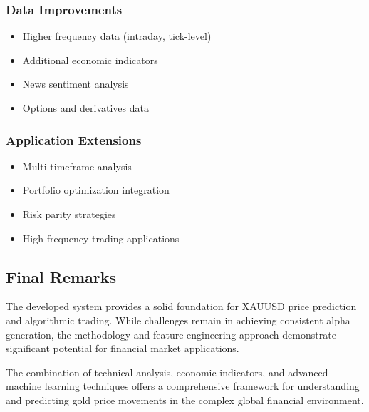 \documentclass[12pt,a4paper]{article}
\begin{document}
\subsubsection{Data Improvements}
\begin{itemize}
    \item Higher frequency data (intraday, tick-level)
    \item Additional economic indicators
    \item News sentiment analysis
    \item Options and derivatives data
\end{itemize}

\subsubsection{Application Extensions}
\begin{itemize}
    \item Multi-timeframe analysis
    \item Portfolio optimization integration
    \item Risk parity strategies
    \item High-frequency trading applications
\end{itemize}

\subsection{Final Remarks}

The developed system provides a solid foundation for XAUUSD price prediction and algorithmic trading. While challenges remain in achieving consistent alpha generation, the methodology and feature engineering approach demonstrate significant potential for financial market applications.

The combination of technical analysis, economic indicators, and advanced machine learning techniques offers a comprehensive framework for understanding and predicting gold price movements in the complex global financial environment.



\end{document}
